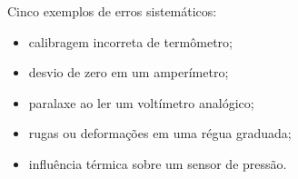 Cinco exemplos de erros sistemáticos:
\begin{itemize}
\item calibragem incorreta de termômetro;
\item desvio de zero em um amperímetro;
\item paralaxe ao ler um voltímetro analógico;
\item rugas ou deformações em uma régua graduada;
\item influência térmica sobre um sensor de pressão.
\end{itemize}